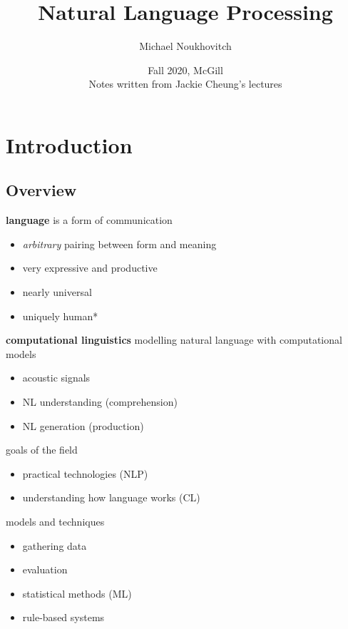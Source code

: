 \documentclass[]{article}
\theoremstyle{definition}
\begin{document}
\let\ref\Cref

\title{\bf{Natural Language Processing}}
\date{Fall 2020, McGill\\ \center Notes written from Jackie Cheung's lectures}
\author{Michael Noukhovitch}

\maketitle
\newpage

\tableofcontents

\newpage

\section{Introduction}%
\label{sec:introduction}

\subsection{Overview}%
\label{sub:overview}

\textbf{language} is a form of communication
\begin{itemize}
    \item \textit{arbitrary} pairing between form and meaning
    \item very expressive and productive
    \item nearly universal
    \item uniquely human*
\end{itemize}

\textbf{computational linguistics} modelling natural language with computational models
\begin{itemize}
    \item acoustic signals
    \item NL understanding (comprehension)
    \item NL generation (production)
\end{itemize}

goals of the field
\begin{itemize}
    \item practical technologies (NLP)
    \item understanding how language works (CL)
\end{itemize}

models and techniques
\begin{itemize}
    \item gathering data
    \item evaluation
    \item statistical methods (ML)
    \item rule-based systems
\end{itemize}
\end{document}
